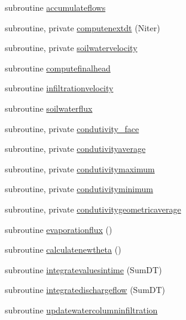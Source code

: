 \begin{DoxyCompactItemize}
subroutine \mbox{\hyperlink{namespacemoduleporousmedia_a96f689b9636ed899f8e42b8e37d1e63d}{accumulateflows}}
\item 
subroutine, private \mbox{\hyperlink{namespacemoduleporousmedia_ae1f8e4af55c2c1a3cad5db62a53c9041}{computenextdt}} (Niter)
\item 
subroutine, private \mbox{\hyperlink{namespacemoduleporousmedia_a717a5b2d4249d602f98474f7a4c24665}{soilwatervelocity}}
\item 
subroutine \mbox{\hyperlink{namespacemoduleporousmedia_ab6c499954f98c7268ff499c927952622}{computefinalhead}}
\item 
subroutine \mbox{\hyperlink{namespacemoduleporousmedia_a42b31332e78c6e4efb8f6b4c8c1bc569}{infiltrationvelocity}}
\item 
subroutine \mbox{\hyperlink{namespacemoduleporousmedia_ad749502c076b86d6579522e1a1377e65}{soilwaterflux}}
\item 
subroutine, private \mbox{\hyperlink{namespacemoduleporousmedia_a702433cf8268af2b48ad2dff405d1202}{condutivity\+\_\+face}}
\item 
subroutine, private \mbox{\hyperlink{namespacemoduleporousmedia_af9319c9dde3c764e53801191ae902220}{condutivityaverage}}
\item 
subroutine, private \mbox{\hyperlink{namespacemoduleporousmedia_ae2e67be2f15dbdf148268d5b0fe82c68}{condutivitymaximum}}
\item 
subroutine, private \mbox{\hyperlink{namespacemoduleporousmedia_acd65a0f6af171e6aea2cd5784f58fcc3}{condutivityminimum}}
\item 
subroutine, private \mbox{\hyperlink{namespacemoduleporousmedia_addae947f6fd1fa818093524bef8b0716}{condutivitygeometricaverage}}
\item 
subroutine \mbox{\hyperlink{namespacemoduleporousmedia_a9e2789b14ba4547dcad30834e1068477}{evaporationflux}} ()
\item 
subroutine \mbox{\hyperlink{namespacemoduleporousmedia_a659c3fab21d457aee320269fbc101787}{calculatenewtheta}} ()
\item 
subroutine \mbox{\hyperlink{namespacemoduleporousmedia_a65ff629d0c1ef9ecd5231bc72cc38c06}{integratevaluesintime}} (Sum\+DT)
\item 
subroutine \mbox{\hyperlink{namespacemoduleporousmedia_ad3dd92d2f8b726911dbb895f480b0725}{integratedischargeflow}} (Sum\+DT)
\item 
subroutine \mbox{\hyperlink{namespacemoduleporousmedia_a5232e9d01e4dffac7d88f9b9d10ddc3f}{updatewatercolumninfiltration}}
\item 

\end{DoxyCompactItemize}
